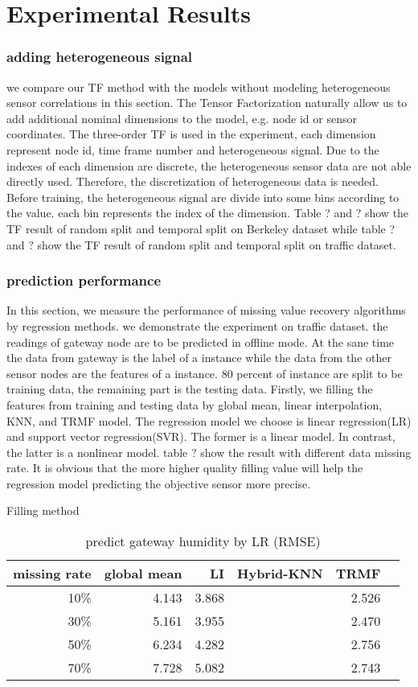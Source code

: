 \section{Experimental Results}  \label{sec:exp}

\subsubsection{adding heterogeneous signal }
we compare our TF method with the models without modeling heterogeneous sensor correlations in this section.
The Tensor Factorization naturally allow us to add additional nominal dimensions to the model, e.g. node id or sensor coordinates. The three-order TF is used in the experiment,
each dimension represent node id, time frame number and heterogeneous signal.  
Due to the indexes of each dimension are discrete, the heterogeneous sensor data are not able directly used. Therefore, the discretization of heterogeneous data is needed. Before training, the heterogeneous signal are divide into some bins according to the value. each bin represents the index of the dimension.
Table ? and ? show the TF result of random split and temporal split on Berkeley dataset while table ? and ? show the TF result of random split and temporal split on traffic dataset.

\subsubsection{prediction performance}
In this section, we measure the performance of missing value recovery algorithms by regression methods. we demonstrate the experiment on traffic dataset.  the readings of gateway node are to be predicted in offline mode. At the sane time the data from gateway is the label of a instance while the data from the other sensor nodes are the features of a instance. 80 percent of instance are split to be training data, the remaining part is the testing data. Firstly, we filling the features from training and testing data by global mean, linear interpolation, KNN, and TRMF model. The regression model we choose is linear regression(LR) and support vector regression(SVR). The former is a linear model. In contrast, the latter is a nonlinear model. table ? show the result with different data missing rate.
It is obvious that the more higher quality filling value will help the regression model predicting the objective sensor more precise.
\begin{table} [htbp]
\centering
\caption{predict gateway humidity by LR (RMSE) }
\label{table: LR}
   Filling method
\begin{tabular}{ r | r r r r r}
        missing rate&global mean     &LI   &Hybrid-KNN &TRMF\\ \hline
        10\%    &4.143&3.868&&2.526\\
        30\%    &5.161&3.955&&2.470\\
        50\%    &6.234&4.282&&2.756\\
        70\%   &7.728&5.082&&2.743\\
  
\end{tabular}
\end{table}

